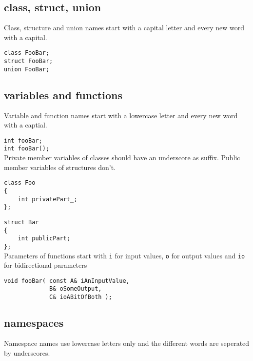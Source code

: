 \documentclass[10pt,a4paper,titlepage,dutch]{report}
\begin{document}
\subsection{class, struct, union}

Class, structure and union names start with a capital letter and
every new word with a capital.

\verb|class FooBar;|\\
\verb|struct FooBar;|\\
\verb|union FooBar;|\\

\subsection{variables and functions}

Variable and function names start with a lowercase letter and
every new word with a captial.

\verb|int fooBar;|\\
\verb|int fooBar();|\\

Private member variables of classes should have an underscore as
suffix.  Public member variables of structures don't.

\verb|class Foo|\\
\verb|{|\\
\verb|    int privatePart_;|\\
\verb|};|

\verb|struct Bar|\\
\verb|{|\\
\verb|    int publicPart;|\\
\verb|};|\\

Parameters of functions start with \verb|i| for input values,
\verb|o| for output values and \verb|io| for bidirectional
parameters

\verb|void fooBar( const A& iAnInputValue, |\\
\verb|             B& oSomeOutput, |\\
\verb|             C& ioABitOfBoth );|\\

\subsection{namespaces}

Namespace names use lowercase letters only and the different words
are seperated by underscores.
\end{document}
